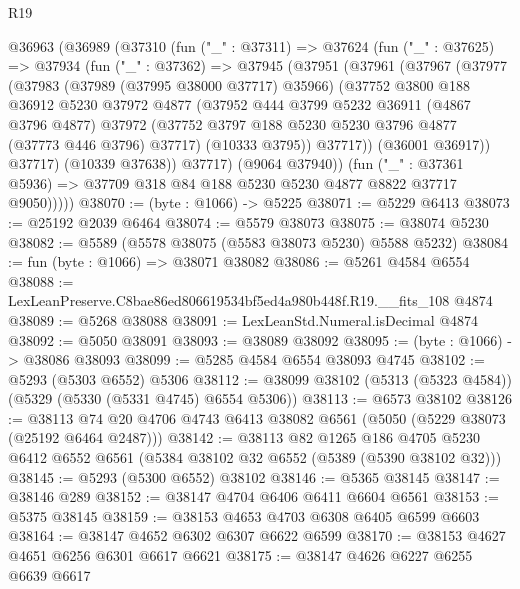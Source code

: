 \begin{lexlean}{R19}
\begin{coremodule}
  @36963
    (@36989
      (@37310
        (fun ("_" : @37311) =>
        @37624
          (fun ("_" : @37625) =>
          @37934
            (fun ("_" : @37362) =>
            @37945
              (@37951
                (@37961
                  (@37967
                    (@37977
                      (@37983
                        (@37989 (@37995 @38000 @37717) @35966)
                        (@37752
                          @3800
                          @188
                          @36912
                          @5230
                          @37972
                          @4877
                          (@37952
                            @444
                            @3799
                            @5232
                            @36911
                            (@4867 @3796 @4877)
                            @37972
                            (@37752 @3797 @188 @5230 @5230 @3796 @4877 (@37773 @446 @3796) @37717)
                            (@10333 @3795))
                          @37717))
                      (@36001 @36917))
                    @37717)
                  (@10339 @37638))
                @37717)
              (@9064 @37940))
            (fun ("_" : @37361 @5936) =>
            @37709 @318 @84 @188 @5230 @5230 @4877 @8822 @37717 @9050)))))
@38070 := (byte : @1066) -> @5225
@38071 := @5229 @6413
@38073 := @25192 @2039 @6464
@38074 := @5579 @38073
@38075 := @38074 @5230
@38082 := @5589 (@5578 @38075 (@5583 @38073 @5230) @5588 @5232)
@38084 := fun (byte : @1066) => @38071 @38082
@38086 := @5261 @4584 @6554
@38088 := LexLeanPreserve.C8bae86ed806619534bf5ed4a980b448f.R19.__fits_108 @4874
@38089 := @5268 @38088
@38091 := LexLeanStd.Numeral.isDecimal @4874
@38092 := @5050 @38091
@38093 := @38089 @38092
@38095 := (byte : @1066) -> @38086 @38093
@38099 := @5285 @4584 @6554 @38093 @4745
@38102 := @5293 (@5303 @6552) @5306
@38112 := @38099 @38102 (@5313 (@5323 @4584)) (@5329 (@5330 (@5331 @4745) @6554 @5306))
@38113 := @6573 @38102
@38126 := @38113 @74 @20 @4706 @4743 @6413 @38082 @6561 (@5050 (@5229 @38073 (@25192 @6464 @2487)))
@38142 := @38113
    @82
    @1265
    @186
    @4705
    @5230
    @6412
    @6552
    @6561
    (@5384 @38102 @32 @6552 (@5389 (@5390 @38102 @32)))
@38145 := @5293 (@5300 @6552) @38102
@38146 := @5365 @38145
@38147 := @38146 @289
@38152 := @38147 @4704 @6406 @6411 @6604 @6561
@38153 := @5375 @38145
@38159 := @38153 @4653 @4703 @6308 @6405 @6599 @6603
@38164 := @38147 @4652 @6302 @6307 @6622 @6599
@38170 := @38153 @4627 @4651 @6256 @6301 @6617 @6621
@38175 := @38147 @4626 @6227 @6255 @6639 @6617

\end{coremodule}
\end{lexlean}
